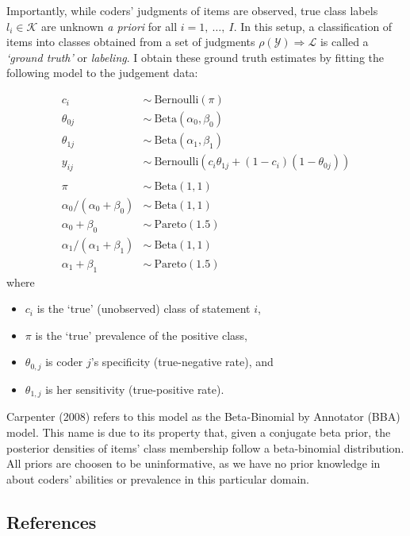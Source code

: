 \documentclass[]{article}
\providecommand{\tightlist}{%
  \setlength{\itemsep}{0pt}\setlength{\parskip}{0pt}}
\begin{document}
Importantly, while coders' judgments of items are observed, true class
labels \(l_i \in \mathcal{K}\) are unknown \emph{a priori} for all
\(i = 1,\ \ldots,\ I\). In this setup, a classification of items into
classes obtained from a set of judgments
\(\rho(\mathcal{Y}) \Rightarrow \mathcal{L}\) is called a \emph{`ground
truth'} or \emph{labeling}. I obtain these ground truth estimates by
fitting the following model to the judgement data:

\[
\begin{align*}
c_i &\sim\ \mbox{Bernoulli}(\pi)\\
\theta_{0j} &\sim\ \mbox{Beta}(\alpha_0 , \beta_0)\\
\theta_{1j} &\sim\ \mbox{Beta}(\alpha_1 , \beta_1)\\
y_{ij} &\sim\ \mbox{Bernoulli}(c_i\theta_{1j} + (1 - c_i)(1  - \theta_{0j}))\\
{}&{}\\
\pi &\sim\ \mbox{Beta}(1,1)\\
\alpha_0/(\alpha_0 + \beta_0) &\sim\ \mbox{Beta}(1,1)\\  
\alpha_0+\beta_0 &\sim\ \mbox{Pareto}(1.5)\\
\alpha_1/(\alpha_1 + \beta_1) &\sim\ \mbox{Beta}(1,1)\\ 
\alpha_1+\beta_1  &\sim\ \mbox{Pareto}(1.5)
\end{align*}
\] where

\begin{itemize}
\tightlist
\item
  \(c_i\) is the `true' (unobserved) class of statement \(i\),
\item
  \(\pi\) is the `true' prevalence of the positive class,
\item
  \(\theta_{0,j}\) is coder \(j\)'s specificity (true-negative rate),
  and
\item
  \(\theta_{1,j}\) is her sensitivity (true-positive rate).
\end{itemize}

Carpenter (2008) refers to this model as the Beta-Binomial by Annotator
(BBA) model. This name is due to its property that, given a conjugate
beta prior, the posterior densities of items' class membership follow a
beta-binomial distribution. All priors are choosen to be uninformative,
as we have no prior knowledge in about coders' abilities or prevalence
in this particular domain.

\hypertarget{references}{%
\subsection*{References}\label{references}}
\end{document}
